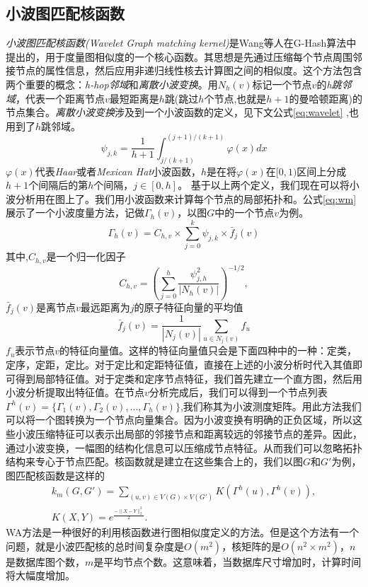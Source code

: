 \documentclass{XDBAthesis}
\begin{document}
\subsection{小波图匹配核函数}
\emph{小波图匹配核函数(Wavelet Graph matching kernel)}\cite{ghash}是Wang等人在G-Hash算法中提出的，用于度量图相似度的一个核心函数。其思想是先通过压缩每个节点周围邻接节点的属性信息，然后应用非递归线性核去计算图之间的相似度。这个方法包含两个重要的概念：\emph{h-hop邻域}和\emph{离散小波变换}。用$N_h (v)$标记一个节点$v$的\emph{h跳邻域}，代表一个距离节点$v$最短距离是$h$跳(跳过$h$个节点,也就是$h+1$的曼哈顿距离)的节点集合。\emph{离散小波变换}涉及到一个小波函数的定义，见下文公式\eqref{eq:wavelet} ,也用到了$h$跳邻域。
\begin{equation}
    \psi_{j,k}=\frac{1}{h+1}\int_{j/(k+1)}^{(j+1)/(k+1)}\varphi(x)dx
    \label{eq:wavelet}
\end{equation}
$\varphi(x)$代表\emph{Haar}或者\emph{Mexican Hat}小波函数，$h$是在将$\varphi(x)$在$[0,1)$区间上分成$h+1$个间隔后的第$h$个间隔，$j\in[0,h]$。
基于以上两个定义，我们现在可以将小波分析用在图上了。我们用小波函数来计算每个节点的局部拓扑和。公式\eqref{eq:wm}展示了一个小波度量方法，记做$\Gamma_h (v)$，以图$G$中的一个节点$v$为例。
\begin{equation}
    \Gamma_h (v)=C_{h,v}\times\sum_{j=0}^k \psi_{j,k}\times\bar{f}_j (v)
    \label{eq:wm}
\end{equation}
其中,$C_{h,v}$是一个归一化因子
\begin{equation}
    C_{h,v}=(\sum_{j=0}^h \frac{\psi_{j,h}^2 }{|N_h (v)|})^{-1/2},
\end{equation}
$\bar{f}_{j}(v)$是离节点$v$最远距离为$j$的原子特征向量的平均值
\begin{equation}
    \bar{f}_{j}(v)=\frac{1}{|N_{j}(v)|}\sum_{u\in N_{j}(v)}f_u
\end{equation}
$f_u $表示节点$v$的特征向量值。这样的特征向量值只会是下面四种中的一种：定类，定序，定距，定比。对于定比和定距特征值，直接在上述的小波分析时代入其值即可得到局部特征值。对于定类和定序节点特征，我们首先建立一个直方图，然后用小波分析提取出特征值。在节点$v$分析完成后，我们可以得到一个节点列表$\Gamma^h (v)=\{\Gamma_{1}(v),\Gamma_{2}(v),...,\Gamma_{h}(v)\}$,我们称其为小波测度矩阵。用此方法我们可以将一个图转换为一个节点向量集合。因为小波变换有明确的正负区域，所以这些小波压缩特征可以表示出局部的邻接节点和距离较远的邻接节点的差异。因此，通过小波变换，一幅图的结构化信息可以压缩成节点特征。从而我们可以忽略拓扑结构来专心于节点匹配。核函数就是建立在这些集合上的，我们以图$G$和$G'$为例，图匹配核函数是这样的
\begin{gather}
    k_{m}(G,G')=\sum_{(u,v)\in V(G)\times V(G')}K(\Gamma^{h}(u),\Gamma^h (v) ), \\
    K(X,Y)=e^{\frac{-\|X-Y\|_{2}^{2}}{2}}.
\end{gather}
WA方法是一种很好的利用核函数进行图相似度定义的方法。但是这个方法有一个问题，就是小波匹配核的总时间复杂度是$O(m^2 )$，核矩阵的是$O(n^2 \times m^2 )$，$n$是数据库图个数，$m$是平均节点个数。这意味着，当数据库尺寸增加时，计算时间将大幅度增加。
\end{document}
